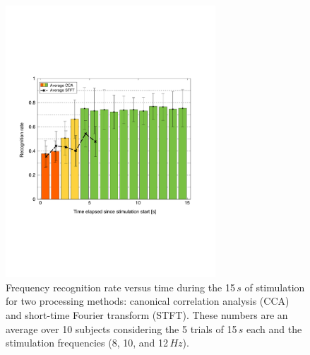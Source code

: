 \documentclass[smallextended]{svjour3}
\begin{document}
\begin{figure}
\center
\includegraphics[width=0.7\textwidth]{figures/all_time_reconn.pdf}
\caption{Frequency recognition rate versus time during the 15\,$s$ of stimulation for two processing methods: canonical correlation analysis (CCA) and short-time Fourier transform (STFT). These numbers are an average over 10 subjects considering the 5 trials of 15\,$s$ each and the stimulation frequencies (8, 10, and 12\,$Hz$).} \label{fig:all_time_reconn}
\end{figure}
\end{document}
